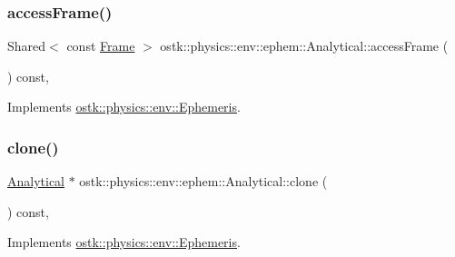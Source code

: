 \subsubsection{\texorpdfstring{access\+Frame()}{accessFrame()}}
{\footnotesize\ttfamily Shared$<$ const \hyperlink{classostk_1_1physics_1_1coord_1_1_frame}{Frame} $>$ ostk\+::physics\+::env\+::ephem\+::\+Analytical\+::access\+Frame (\begin{DoxyParamCaption}{ }\end{DoxyParamCaption}) const\hspace{0.3cm}{\ttfamily [override]}, {\ttfamily [virtual]}}



Implements \hyperlink{classostk_1_1physics_1_1env_1_1_ephemeris_a7a2e78c90901d813311d51d66fcf12bf}{ostk\+::physics\+::env\+::\+Ephemeris}.

\mbox{\label{classostk_1_1physics_1_1env_1_1ephem_1_1_analytical_aeb01e31d1fd2d142efa5815ff3a44ea4}} 
\subsubsection{\texorpdfstring{clone()}{clone()}}
{\footnotesize\ttfamily \hyperlink{classostk_1_1physics_1_1env_1_1ephem_1_1_analytical}{Analytical} $\ast$ ostk\+::physics\+::env\+::ephem\+::\+Analytical\+::clone (\begin{DoxyParamCaption}{ }\end{DoxyParamCaption}) const\hspace{0.3cm}{\ttfamily [override]}, {\ttfamily [virtual]}}



Implements \hyperlink{classostk_1_1physics_1_1env_1_1_ephemeris_a3a35daaff1359882ae16b69ab6e399f6}{ostk\+::physics\+::env\+::\+Ephemeris}.

\mbox{\label{classostk_1_1physics_1_1env_1_1ephem_1_1_analytical_ac832a4552abfbeba38891cb936bc15ef}} 
